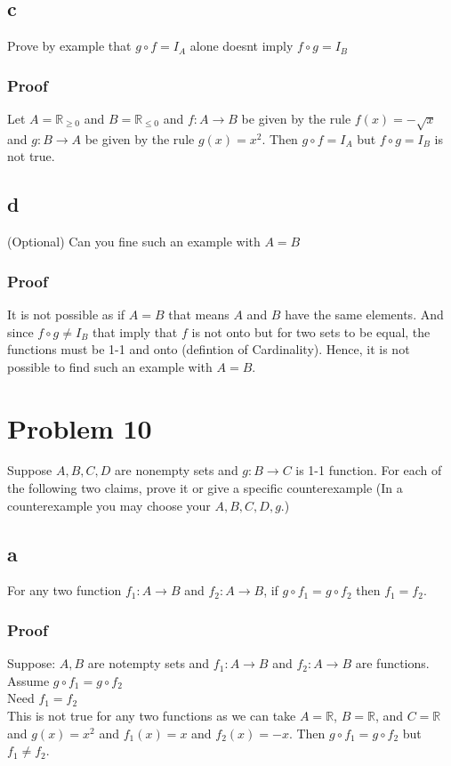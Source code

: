 \documentclass{article}
\begin{document}
\subsection*{c}
Prove by example that $g \circ f = I_A$ alone doesnt imply $f \circ g = I_B$
\subsubsection*{Proof}
Let $A = \mathbb{R}_{\geq 0}$ and $B = \mathbb{R}_{\leq 0}$ and $f: A \rightarrow B$ be given by the rule $f(x) = -\sqrt{x}$ and $g: B \rightarrow A$ be given by the rule $g(x) = x^2$. Then $g \circ f = I_A$ but $f \circ g = I_B$ is not true.
\subsection*{d}
(Optional) Can you fine such an example with $A = B$
\subsubsection*{Proof}
It is not possible as if $A = B$ that means $A$ and $B$ have the same elements. And since $f \circ g \neq I_B$ that imply that $f$ is not onto but for two sets to be equal, the functions must be 1-1 and onto (defintion of Cardinality). Hence, it is not possible to find such an example with $A = B$.
\section*{Problem 10}
Suppose $A,B,C,D$ are nonempty sets and $g: B \rightarrow C$ is 1-1 function.
For each of the following two claims, prove it or give a specific counterexample (In a counterexample you may choose your $A,B,C,D,g$.)
\subsection*{a}
For any two function $f_1: A \rightarrow B $ and $f_2: A \rightarrow B$, if $g \circ f_1 = g \circ f_2$ then $f_1 = f_2$.
\subsubsection*{Proof}
Suppose: $A,B$ are notempty sets and $f_1: A \rightarrow B $ and $f_2: A \rightarrow B$ are functions. \\
Assume $g \circ f_1 = g \circ f_2$\\
Need $f_1 = f_2$\\
This is not true for any two functions as we can take $A = \mathbb{R}$, $B = \mathbb{R}$, and $C = \mathbb{R}$ and $g(x) = x^2$ and $f_1(x) = x$ and $f_2(x) = -x$. Then $g \circ f_1 = g \circ f_2$ but $f_1 \neq f_2$. 
\end{document}
